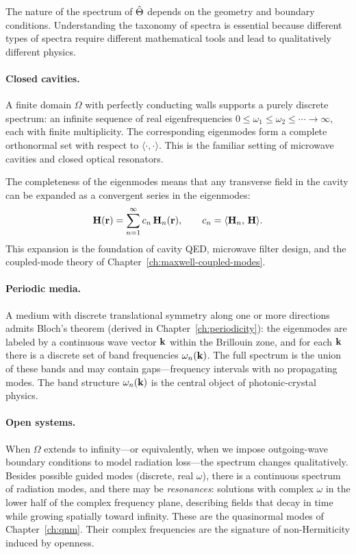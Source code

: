 The nature of the spectrum of $\hat{\Theta}$ depends on the geometry and boundary
conditions. Understanding the taxonomy of spectra is essential because
different types of spectra require different mathematical tools and lead to
qualitatively different physics.

\paragraph{Closed cavities.}
A finite domain $\Omega$ with perfectly conducting walls supports a purely
discrete spectrum: an infinite sequence of real eigenfrequencies
$0 \le \omega_1 \le \omega_2 \le \cdots \to \infty$, each with finite
multiplicity. The corresponding eigenmodes form a complete orthonormal set
with respect to $\langle\cdot,\cdot\rangle$. This is the familiar
setting of microwave cavities and closed optical resonators.

The completeness of the eigenmodes means that any transverse field in the
cavity can be expanded as a convergent series in the eigenmodes:
\begin{equation}
 \mathbf{H}(\mathbf{r}) = \sum_{n=1}^{\infty} c_n\,\mathbf{H}_n(\mathbf{r}),
 \qquad c_n = \langle\mathbf{H}_n,\,\mathbf{H}\rangle.
 \label{eq:mode-expansion-closed}
\end{equation}
This expansion is the foundation of cavity QED, microwave filter design,
and the coupled-mode theory of Chapter~\ref{ch:maxwell-coupled-modes}.

\paragraph{Periodic media.}
A medium with discrete translational symmetry along one or more directions
admits Bloch's theorem (derived in Chapter~\ref{ch:periodicity}): the
eigenmodes are labeled by a continuous wave vector $\mathbf{k}$ within the
Brillouin zone, and for each $\mathbf{k}$ there is a discrete set of band
frequencies $\omega_n(\mathbf{k})$. The full spectrum is the union of these
bands and may contain gaps---frequency intervals with no propagating modes.
The band structure $\omega_n(\mathbf{k})$ is the central object of photonic-crystal
physics.

\paragraph{Open systems.}
When $\Omega$ extends to infinity---or equivalently, when we impose
outgoing-wave boundary conditions to model radiation loss---the spectrum
changes qualitatively. Besides possible guided modes (discrete, real
$\omega$), there is a continuous spectrum of radiation modes, and there may
be \emph{resonances}: solutions with complex $\omega$ in the lower half of
the complex frequency plane, describing fields that decay in time while
growing spatially toward infinity. These are the quasinormal modes of
Chapter~\ref{ch:qnm}. Their complex frequencies are the signature of
non-Hermiticity induced by openness.

